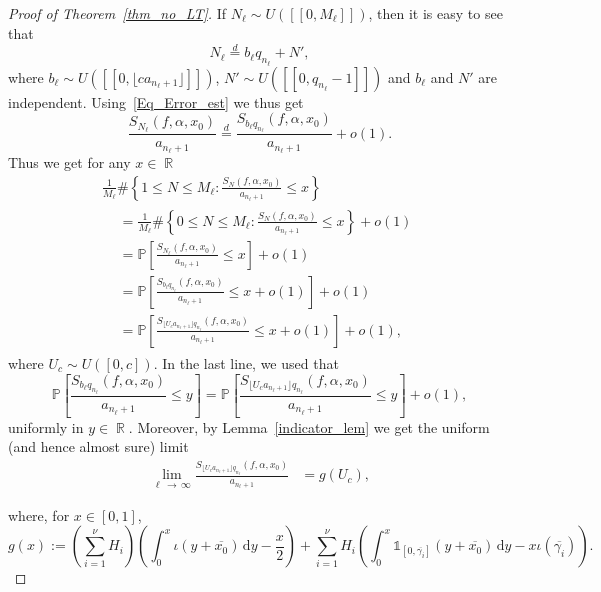 \documentclass[AHL,Unicode,longabstracts,published]{cedram}
\DeclareMathOperator{\R}{\mathbb{R}}
\newcommand{\bbP}{\mathbb{P}}
\newcommand{\rmd}{\mathrm{d}}
\newcommand{\kj}{n_{\ell}}
\begin{document}
\begin{proof}[Proof of Theorem~\ref{thm_no_LT}]
If $N_{\ell} \sim U([\![0, M_{\ell}]\!])$, then it is easy to see that
\begin{equation*}
N_{\ell } \stackrel{d}{=} b_{\ell}q_{n_{\ell}} +N',
\end{equation*}
where $b_{\ell} \sim U([\![0,\lfloor ca_{n_{\ell}+1}\rfloor]\!])$, $N' \sim U([\![0,q_{n_{\ell}}-1]\!])$ and $b_{\ell}$ and $N'$ are independent. Using~\eqref{Eq_Error_est} we thus get
\begin{equation*}
\frac{S_{N_\ell}(f, \alpha, x_0)}{a_{\kj +1}} \stackrel{d}{=} \frac{S_{b_\ell q_{\kj }}(f, \alpha, x_0)}{a_{\kj +1}} + o(1).
\end{equation*}
Thus we get for any $x \in \R$
\begin{multline*}
\frac{1}{M_{\ell}} \# \left \{ 1 \leq N \leq M_{\ell} : \frac{S_N(f, \alpha, x_0)}{a_{n_{\ell}+1}} \leq x \right \}\\
\begin{aligned}
&= \frac{1}{M_{\ell}} \# \left \{ 0 \leq N \leq M_{\ell} : \frac{S_N(f, \alpha, x_0)}{a_{n_{\ell}+1}} \leq x \right \} + o(1)
\\& = \bbP \left[\frac{S_{N_\ell}(f, \alpha, x_0)}{a_{n_\ell +1}} \leq x \right] + o(1) \\
&= \bbP \left[\frac{S_{b_\ell q_{\kj }}(f, \alpha, x_0)}{a_{n_\ell +1}} \leq x + o(1)\right] + o(1) \\
&= \bbP \left[\frac{S_{ \lfloor U_c a_{\kj +1} \rfloor q_{\kj }}(f, \alpha, x_0)}{a_{n_\ell +1}} \leq x + o(1)\right] + o(1),
\end{aligned}
\end{multline*}
where $U_c \sim U([0,c])$. In the last line, we used that
\[
\bbP \left[\frac{S_{b_\ell q_{\kj }}(f, \alpha, x_0)}{a_{n_\ell +1}} \leq y \right] = \bbP \left[\frac{S_{\lfloor U_c a_{\kj +1} \rfloor q_{\kj }}(f, \alpha, x_0)}{a_{n_\ell +1}} \leq y \right] + o(1),
\]
uniformly in $y \in \R$. Moreover, by Lemma~\ref{indicator_lem} we get the uniform (and hence almost sure) limit
\begin{align*}
\lim_{\ell\,\to\,\infty} \frac{S_{ \lfloor U_c a_{n_{\ell}+1} \rfloor q_{n_{\ell}} }(f, \alpha, x_0) }{a_{n_\ell +1}} &= g(U_c),
\end{align*}

where, for $x \in [0,1]$,
\[
g(x) :=
\left(\sum_{i = 1}^{\nu} H_i\right)\left(\int_{0}^{x} \iota(y + \overline{x_0}) \, \rmd y - \frac{x}{2}\right) + \sum_{i = 1}^{\nu} H_i\left(\int_{0}^{x} \mathds{1}_{\left[0, \overline{\gamma_i}\right]}\left(y + \overline{x_0}\right) \,\rmd y - x\iota(\overline{\gamma_i})\right).
\]


\end{proof}
\end{document}
